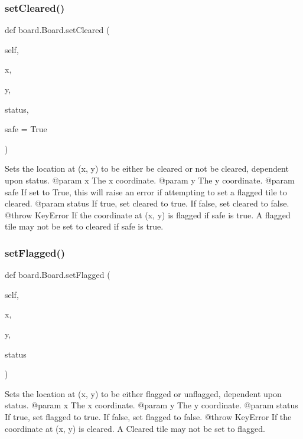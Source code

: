 \subsubsection{\texorpdfstring{setCleared()}{setCleared()}}
{\footnotesize\ttfamily def board.\+Board.\+set\+Cleared (\begin{DoxyParamCaption}\item[{}]{self,  }\item[{}]{x,  }\item[{}]{y,  }\item[{}]{status,  }\item[{}]{safe = {\ttfamily True} }\end{DoxyParamCaption})}

\begin{DoxyVerb}Sets the location at (x, y) to be either be cleared or not be cleared, dependent upon status.
@param x The x coordinate.
@param y The y coordinate.
@param safe If set to True, this will raise an error if attempting to set a flagged tile to cleared.
@param status If true, set cleared to true. If false, set cleared to false.
@throw KeyError If the coordinate at (x, y) is flagged if safe is true. A flagged tile may not be set to cleared if safe is true.
\end{DoxyVerb}
 \mbox{\label{classboard_1_1_board_aa873286b9859c0a13f446f776fa7b125}} 
\subsubsection{\texorpdfstring{setFlagged()}{setFlagged()}}
{\footnotesize\ttfamily def board.\+Board.\+set\+Flagged (\begin{DoxyParamCaption}\item[{}]{self,  }\item[{}]{x,  }\item[{}]{y,  }\item[{}]{status }\end{DoxyParamCaption})}

\begin{DoxyVerb}Sets the location at (x, y) to be either flagged or unflagged, dependent upon status.
@param x The x coordinate.
@param y The y coordinate.
@param status If true, set flagged to true. If false, set flagged to false.
@throw KeyError If the coordinate at (x, y) is cleared. A Cleared tile may not be set to flagged.
\end{DoxyVerb}
 

